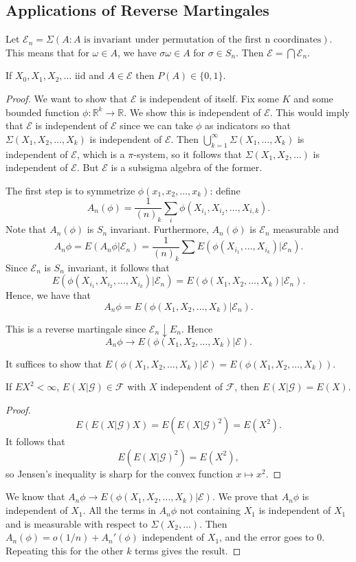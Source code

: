 \documentclass[11pt]{scrartcl}
\newcommand{\R}{\mathbb{R}}
\let \mc \mathcal
\begin{document}
\subsection{Applications of Reverse Martingales}
\begin{definition} Let $\mathcal E_n = \Sigma (A: A\text{ is invariant under permutation of the first n coordinates})$.  This means that for $\omega \in A$, we have $\sigma \omega \in A$ for $\sigma \in S_n$. Then $\mathcal E = \bigcap \mc E_n$. 
\end{definition}
\begin{thm} If $X_0, X_1, X_2, \dots$ iid and $A\in \mc E$ then $P(A) \in \{0, 1\}.$
\end{thm}
\begin{proof}
We want to show that $\mc E$ is independent of itself.  Fix some $K$ and some bounded function $\phi: \R^k \to \R$.  We show this is independent of $\mc E$.  This would imply that $\mc E$ is independent of $\mc E$ since we can take $\phi$ as indicators so that $\Sigma(X_1, X_2, \dots, X_k)$ is independent of $\mc E$.  Then $\bigcup_{k=1}^{\infty} \Sigma(X_1, \dots, X_k)$ is independent of $\mc E$, which is a $\pi$-system, so it follows that 
$\Sigma(X_1, X_2, \dots)$ is independent of $\mc E$.  But $\mc E$ is a subsigma algebra of the former.  

The first step is to symmetrize $\phi(x_1, x_2, \dots, x_k)$: define 
$$A_n(\phi) = \frac{1}{(n)_k}\sum_{i} \phi(X_{i_1}, X_{i_2}, \dots, X_{i, k}).$$
Note that $A_n(\phi)$ is $S_n$ invariant.  Furthermore, $A_n(\phi)$ is $\mc E_n$ measurable and 
$$A_n\phi = E(A_n\phi|\mc E_n) = \frac{1}{(n)_k} \sum E(\phi(X_{i_1}, \dots, X_{i_k})| \mc E_n).$$
Since $\mc E_n$ is $S_n$ invariant, it follows that 
$$E(\phi(X_{i_1}, X_{i_2}, \dots, X_{i_k}) | \mc E_n) = E(\phi(X_1, X_2, \dots, X_k) | \mc E_n).$$
Hence, we have that 
$$A_n\phi = E(\phi(X_1, X_2, \dots, X_k)| \mc E_n).$$

This is a reverse martingale since $\mc E_n \downarrow E_n$.  Hence 
$$A_n\phi \to E(\phi(X_1, X_2, \dots, X_k) | \mc E).$$

It suffices to show that $E(\phi(X_1, X_2, \dots, X_k)| \mc E) = E(\phi(X_1, X_2, \dots, X_k)).$
\begin{lemma} If $EX^2 < \infty$, $E(X|\mc G) \in \mc F$ with $X$ independent of $\mc F$, then $E(X|\mc G) = E(X)$.
\end{lemma}
\begin{proof}
$$E(E(X|\mc G)X) = E(E(X|\mc G)^2) = E(X^2).$$
It follows that 
$$E(E(X|\mc G)^2) = E(X^2),$$
so Jensen's inequality is sharp for the convex function $x \mapsto x^2$.
\end{proof}

We know that $A_n\phi \to E(\phi(X_1, X_2, \dots, X_k)| \mc E).$  We prove that $A_n\phi$ is independent of $X_1$.  All the terms in $A_n\phi$ not containing $X_1$ is independent of $X_1$ and is measurable with respect to $\Sigma(X_2, \dots)$.  Then $A_n(\phi)= o(1/n) + A_n'(\phi)$ independent of $X_1$, and the error goes to $0$.  Repeating this for the other $k$ terms gives the result.  
\end{proof}
\pagebreak
\end{document}
